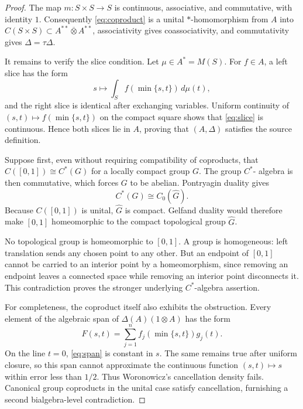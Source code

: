 \documentclass[11pt]{article}
\newcommand{\D}{\Delta}
\begin{document}
\begin{proof}
The map $m:S\times S\to S$ is continuous, associative, and commutative, with
identity $1$.  Consequently \eqref{eq:coproduct} is a unital
$*$-homomorphism from $A$ into $C(S\times S)\subset
A^{**}\overline\otimes A^{**}$, associativity gives coassociativity, and
commutativity gives $\D=\tau\D$.

It remains to verify the slice condition.  Let $\mu\in A^*=M(S)$.  For
$f\in A$, a left slice has the form
\begin{equation}\label{eq:slice}
 s\longmapsto \int_S f(\min\{s,t\})\,d\mu(t),
\end{equation}
and the right slice is identical after exchanging variables.  Uniform
continuity of $(s,t)\mapsto f(\min\{s,t\})$ on the compact square shows that
\eqref{eq:slice} is continuous.  Hence both slices lie in $A$, proving that
$(A,\D)$ satisfies the source definition.

Suppose first, even without requiring compatibility of coproducts, that
$C([0,1])\cong C^*(G)$ for a locally compact group $G$.  The group $C^*$-
algebra is then commutative, which forces $G$ to be abelian.  Pontryagin
duality gives
\begin{equation}\label{eq:pontryagin}
 C^*(G)\cong C_0(\widehat G).
\end{equation}
Because $C([0,1])$ is unital, $\widehat G$ is compact.  Gelfand duality would
therefore make $[0,1]$ homeomorphic to the compact topological group
$\widehat G$.

No topological group is homeomorphic to $[0,1]$.  A group is homogeneous:
left translation sends any chosen point to any other.  But an endpoint of
$[0,1]$ cannot be carried to an interior point by a homeomorphism, since
removing an endpoint leaves a connected space while removing an interior
point disconnects it.  This contradiction proves the stronger underlying
$C^*$-algebra assertion.

For completeness, the coproduct itself also exhibits the obstruction.  Every
element of the algebraic span of $\D(A)(1\otimes A)$ has the form
\begin{equation}\label{eq:span}
 F(s,t)=\sum_{j=1}^n f_j(\min\{s,t\})g_j(t).
\end{equation}
On the line $t=0$, \eqref{eq:span} is constant in $s$.  The same remains true
after uniform closure, so this span cannot approximate the continuous
function $(s,t)\mapsto s$ within error less than $1/2$.  Thus Woronowicz's
cancellation density fails.  Canonical group coproducts in the unital case
satisfy cancellation, furnishing a second bialgebra-level contradiction.
\end{proof}
\end{document}
